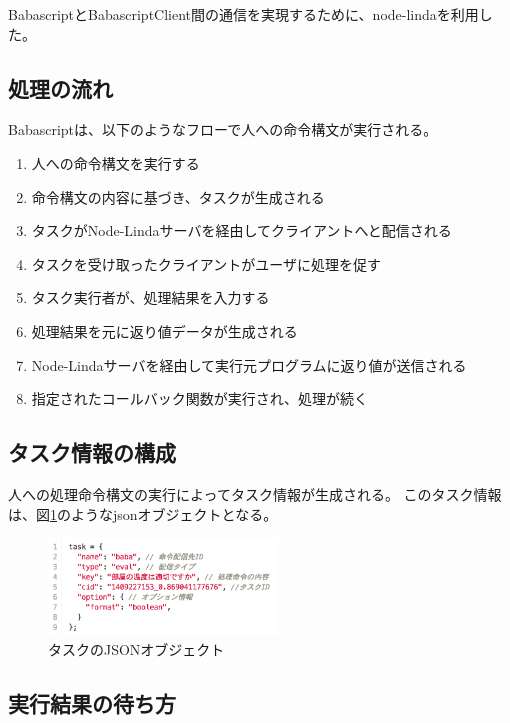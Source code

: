 BabascriptとBabascriptClient間の通信を実現するために、node-linda\cite{linda}を利用した。

\subsection{処理の流れ}\label{ux51e6ux7406ux306eux6d41ux308c}

Babascriptは、以下のようなフローで人への命令構文が実行される。

\begin{enumerate}
\def\labelenumi{\arabic{enumi}.}
\itemsep1pt\parskip0pt
\item
  人への命令構文を実行する
\item
  命令構文の内容に基づき、タスクが生成される
\item
  タスクがNode-Lindaサーバを経由してクライアントへと配信される
\item
  タスクを受け取ったクライアントがユーザに処理を促す
\item
  タスク実行者が、処理結果を入力する
\item
  処理結果を元に返り値データが生成される
\item
  Node-Lindaサーバを経由して実行元プログラムに返り値が送信される
\item
  指定されたコールバック関数が実行され、処理が続く
\end{enumerate}

\subsection{タスク情報の構成}\label{ux30bfux30b9ux30afux60c5ux5831ux306eux69cbux6210}

人への処理命令構文の実行によってタスク情報が生成される。
このタスク情報は、図\ref{task}のようなjsonオブジェクトとなる。

\begin{figure}[!h]
  \includegraphics[width=230px]{./images/task.png}
  \caption{タスクのJSONオブジェクト}  
  \label{task}
\end{figure}

\subsection{実行結果の待ち方}\label{ux5b9fux884cux7d50ux679cux306eux5f85ux3061ux65b9}

